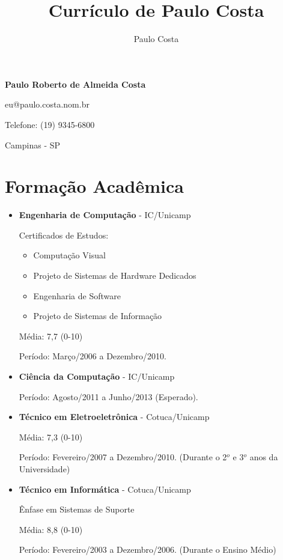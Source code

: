 \documentclass[a4paper,10pt]{article}
\title{Currículo de Paulo Costa}
\author{Paulo Costa}
\begin{document}
  
  \LARGE\textbf{Paulo Roberto de Almeida Costa}

  \large eu@paulo.costa.nom.br

  \large Telefone: (19) 9345-6800

  \large Campinas - SP %

  \normalsize 
  \section{Formação Acadêmica}
    \begin{itemize}
      \item  
        \textbf{Engenharia de Computação} - IC/Unicamp

        Certificados de Estudos:
        \begin{itemize}
          \item Computação Visual
          \item Projeto de Sistemas de Hardware Dedicados
          \item Engenharia de Software
          \item Projeto de Sistemas de Informação
        \end{itemize}

        Média: 7,7 (0-10)

        Período: Março/2006 a Dezembro/2010.

      \item  
        \textbf{Ciência da Computação} - IC/Unicamp

        Período: Agosto/2011 a Junho/2013 (Esperado).

      \item  
        \textbf{Técnico em Eletroeletrônica} - Cotuca/Unicamp

        Média: 7,3  (0-10)

        Período: Fevereiro/2007 a Dezembro/2010. {\small(Durante o 2$^{o}$ e 3$^{o}$ anos da Universidade)}

      \item  
        \textbf{Técnico em Informática} - Cotuca/Unicamp

        Ênfase em Sistemas de Suporte

        Média: 8,8  (0-10)

        Período: Fevereiro/2003 a Dezembro/2006. {\small(Durante o Ensino Médio)}

    \end{itemize}
\end{document}
